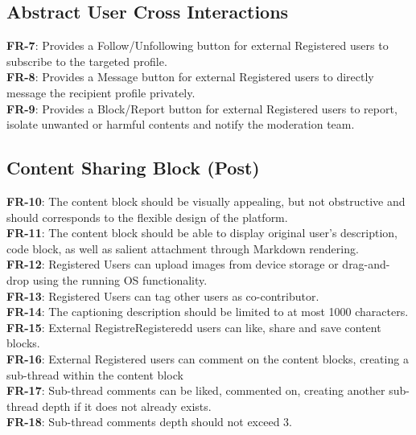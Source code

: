         \subsection{Abstract User Cross Interactions}
        \textbf{FR-7}: Provides a Follow/Unfollowing button for external Registered users to subscribe to the targeted profile.
        \\
        \textbf{FR-8}: Provides a Message button for external Registered users to directly message the recipient profile privately.
        \\
        \textbf{FR-9}: Provides a Block/Report button for external Registered users to report, isolate unwanted or harmful contents and notify the moderation team.
        
        \subsection{Content Sharing Block (Post)}
        \textbf{FR-10}: The content block should be visually appealing, but not obstructive and should corresponds to the flexible design of the platform.
        \\
        \textbf{FR-11}: The content block should be able to display original user's description, code block, as well as salient attachment through Markdown rendering.
        \\
        \textbf{FR-12}: Registered Users can upload images from device storage or drag-and-drop using the running OS functionality.
        \\
        \textbf{FR-13}: Registered Users can tag other users as co-contributor.
        \\
        \textbf{FR-14}: The captioning description should be limited to at most 1000 characters.
        \\
        \textbf{FR-15}: External RegistreRegisteredd users can like, share and save content blocks.
        \\
        \textbf{FR-16}: External Registered users can comment on the content blocks, creating a sub-thread within the content block
        \\
        \textbf{FR-17}: Sub-thread comments can be liked, commented on, creating another sub-thread depth if it does not already exists.
        \\
        \textbf{FR-18}: Sub-thread comments depth should not exceed 3.

